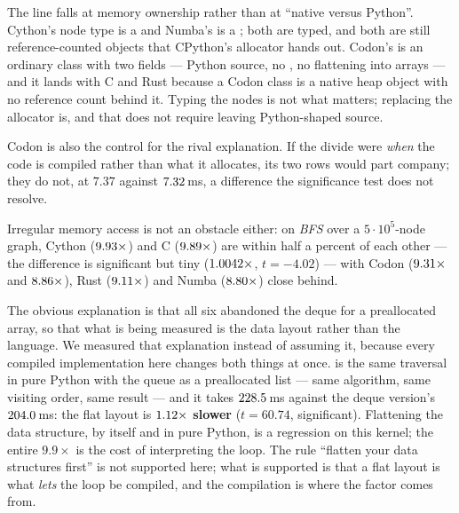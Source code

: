The line falls at memory ownership rather than at ``native versus Python''. Cython's node type is a
 and Numba's is a ; both are typed, and both are still
reference-counted objects that CPython's allocator hands out. Codon's is an ordinary class with
two  fields --- Python source, no , no flattening into arrays ---
and it lands with C and Rust because a Codon class is a native heap object with no reference
count behind it. Typing the nodes is not what matters; replacing the allocator is, and that
does not require leaving Python-shaped source.

Codon is also the control for the rival explanation. If the divide were \emph{when} the code is
compiled rather than what it allocates, its two rows would part company; they do not, at $7.37$
against $\meas{med:b2_branchy-314:binarytrees/codon_jit:ms}{7.32}$\,ms, a difference the significance test does not resolve.

Irregular memory access is not an obstacle either: on \emph{BFS} over a $5\cdot10^5$-node
graph, Cython ($\meas{ratio:b2_branchy-314:bfs/cpython_loop|b2_branchy-314:bfs/cython}{9.93}\times$) and C ($\meas{ratio:b2_branchy-314:bfs/cpython_loop|b2_branchy-314:bfs/c_ctypes}{9.89}\times$) are within half a percent of each other ---
the difference is significant but tiny ($\meas{ratio:b2_branchy-314:bfs/c_ctypes|b2_branchy-314:bfs/cython}{1.0042}\times$, $t=-4.02$) --- with Codon
($\meas{ratio:b2_branchy-314:bfs/cpython_loop|b2_branchy-314:bfs/codon_pyext}{9.31}\times$ and $\meas{ratio:b2_branchy-314:bfs/cpython_loop|b2_branchy-314:bfs/codon_jit}{8.86}\times$), Rust ($\meas{ratio:b2_branchy-314:bfs/cpython_loop|b2_branchy-314:bfs/rust_ctypes}{9.11}\times$) and Numba ($\meas{ratio:b2_branchy-314:bfs/cpython_loop|b2_branchy-314:bfs/numba}{8.80}\times$) close behind.

The obvious explanation is that all six abandoned the deque for a preallocated array, so that
what is being measured is the data layout rather than the language. We measured that
explanation instead of assuming it, because every compiled implementation here changes both
things at once.  is the same traversal in pure Python with the queue as a
preallocated list --- same algorithm, same visiting order, same result --- and it takes
$\meas{med:b2_branchy-314:bfs/cpython_flat:ms}{228.5}$\,ms against the deque version's $\meas{med:b2_branchy-314:bfs/cpython_loop:ms}{204.0}$\,ms: the flat layout is \textbf{$\meas{ratio:b2_branchy-314:bfs/cpython_flat|b2_branchy-314:bfs/cpython_loop}{1.12}\times$
slower} ($t=60.74$, significant). Flattening the data structure, by itself and in pure Python,
is a regression on this kernel; the entire $9.9\times$ is the cost of interpreting the loop. The
rule ``flatten your data structures first'' is not supported here; what is supported is that a
flat layout is what \emph{lets} the loop be compiled, and the compilation is where the factor
comes from.

